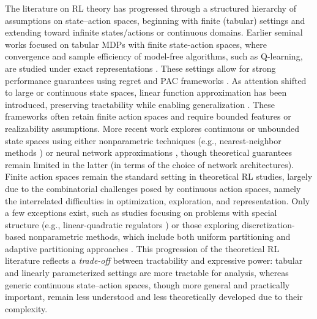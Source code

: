 \documentclass[final,supplement]{siamart251216}
\begin{document}
The literature on RL theory has progressed through a structured hierarchy of assumptions on state–action spaces, beginning with finite (tabular) settings and extending toward infinite states/actions or continuous domains. Earlier seminal works focused on tabular MDPs with finite state-action spaces, where convergence and sample efficiency of model-free algorithms, such as Q-learning, are studied under exact representations \cite{auer2008near,dayan1992q,jaakkola1993convergence,kakade2003sample}. These settings allow for strong performance guarantees using regret and PAC frameworks \cite{azar2017minimax,dann2017unifying}. As attention shifted to large or continuous state spaces,  linear function approximation has been introduced, preserving tractability while enabling generalization \cite{tsitsiklis1996analysis,bertsekas1996neuro,lazaric2012finite}. These frameworks often retain finite action spaces and require bounded features or realizability assumptions. More recent work explores continuous or unbounded state spaces using either nonparametric techniques (e.g., nearest-neighbor methods \cite{jin2020provably}) or neural network approximations \cite{fan2020theoretical,fu2020single,wang2019neural}, though theoretical guarantees remain limited in the latter (in terms of the choice of network architectures). Finite action spaces remain the standard setting in theoretical RL studies, largely due to the combinatorial challenges posed by continuous action spaces, namely the interrelated difficulties in optimization, exploration, and representation. Only a few exceptions exist, such as studies focusing on problems with special structure (e.g., linear-quadratic regulators \cite{fazel2018global,hambly2021policy,guo2023fast}) or those exploring discretization-based nonparametric methods, which include both uniform partitioning \cite{bayraktar2023approximate,kara2023q} and adaptive partitioning approaches \cite{dong2019provably,pazis2013pac, sinclair2023adaptive}.  This progression of the theoretical RL literature reflects a {\it trade-off} between tractability and expressive power: tabular and linearly parameterized settings are more tractable for analysis, whereas generic continuous state–action spaces, though more general and practically important, remain less understood and less theoretically developed due to their complexity.
\end{document}
